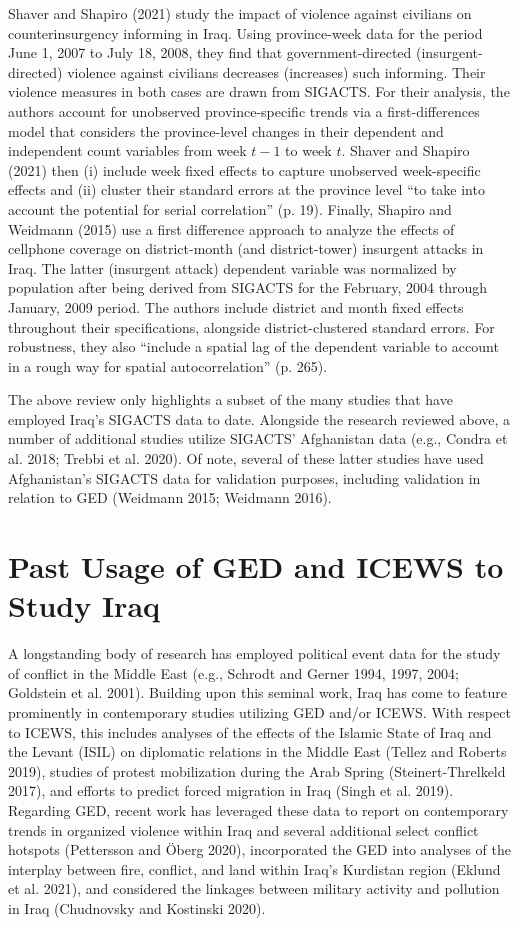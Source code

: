 \documentclass[12pt]{article}
\begin{document}
Shaver and Shapiro (2021) study the impact of violence against civilians on counterinsurgency informing in Iraq. Using province-week data for the period June 1, 2007 to July 18, 2008, they find that government-directed (insurgent-directed) violence against civilians decreases (increases) such informing. Their violence measures in both cases are drawn from SIGACTS. For their analysis, the authors account for unobserved province-specific trends via a first-differences model that considers the province-level changes in their dependent and independent count variables from week $t-1$ to week $t$. Shaver and Shapiro (2021) then (i) include week fixed effects to capture unobserved week-specific effects and (ii) cluster their standard errors at the province level ``to take into account the potential for serial correlation'' (p. 19). Finally, Shapiro and Weidmann (2015) use a first difference approach to analyze the effects of cellphone coverage on district-month (and district-tower) insurgent attacks in Iraq. The latter (insurgent attack) dependent variable was normalized by population after being derived from SIGACTS for the February, 2004 through January, 2009 period. The authors include district and month fixed effects throughout their specifications, alongside district-clustered standard errors. For robustness, they also ``include a spatial lag of the dependent variable to account in a rough way for spatial autocorrelation'' (p. 265).

The above review only highlights a subset of the many studies that have employed Iraq's SIGACTS data to date. Alongside the research reviewed above, a number of additional studies utilize SIGACTS' Afghanistan data (e.g., Condra et al. 2018; Trebbi et al. 2020). Of note, several of these latter studies have used Afghanistan's SIGACTS data for validation purposes, including validation in relation to GED (Weidmann 2015; Weidmann 2016).

\section{Past Usage of GED and ICEWS to Study Iraq}

A longstanding body of research has employed political event data for the study of conflict in the Middle East (e.g., Schrodt and Gerner 1994, 1997, 2004; Goldstein et al. 2001). Building upon this seminal work, Iraq has come to feature prominently in contemporary studies utilizing GED and/or ICEWS. With respect to ICEWS, this includes analyses of the effects of the Islamic State of Iraq and the Levant (ISIL) on diplomatic relations in the Middle East (Tellez and Roberts 2019), studies of protest mobilization during the Arab Spring (Steinert-Threlkeld 2017), and efforts to predict forced migration in Iraq (Singh et al. 2019). Regarding GED, recent work has leveraged these data to report on contemporary trends in organized violence within Iraq and several additional select conflict hotspots (Pettersson and \"{O}berg 2020), incorporated the GED into analyses of the interplay between fire, conflict, and land within Iraq's Kurdistan region (Eklund et al. 2021), and considered the linkages between military activity and pollution in Iraq (Chudnovsky and Kostinski 2020).
\end{document}
